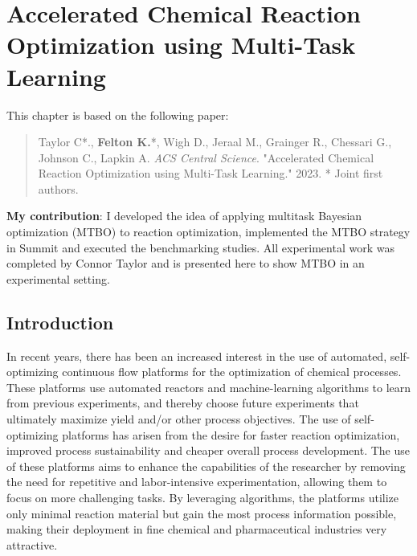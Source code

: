 \chapter{Accelerated Chemical Reaction Optimization using Multi-Task Learning}\label{ch:mtbo} 
This chapter is based on the following paper:

\begin{quote}
    Taylor C*., \textbf{Felton K.}*, Wigh D., Jeraal M., Grainger R., Chessari G., Johnson C., Lapkin A. \textit{ACS Central Science}. "Accelerated Chemical Reaction Optimization using Multi-Task Learning." 2023.
    * Joint first authors.
\end{quote}
\textbf{My contribution}: I developed  the idea of applying multitask Bayesian optimization (MTBO) to reaction optimization, implemented the MTBO strategy in Summit and executed the benchmarking studies. All experimental work was completed by Connor Taylor and is presented here to show MTBO in an experimental setting.

\section{Introduction}

In recent years, there has been an increased interest in the use of automated, self-optimizing continuous flow platforms for the optimization of chemical processes.\cite{Reizman2016a, Fabry2016, Fitzpatrick2016, CortesBorda2016} These platforms use automated reactors and machine-learning algorithms to learn from previous experiments, and thereby choose future experiments that ultimately maximize yield and/or other process objectives. The use of self-optimizing platforms has arisen from the desire for faster reaction optimization, improved process sustainability and cheaper overall process development. The use of these platforms aims to enhance the capabilities of the researcher by removing the need for repetitive and labor-intensive experimentation, allowing them to focus on more challenging tasks. By leveraging algorithms, the platforms utilize only minimal reaction material but gain the most process information possible, making their deployment in fine chemical and pharmaceutical industries very attractive.\cite{Clayton2019, Clayton2020}

